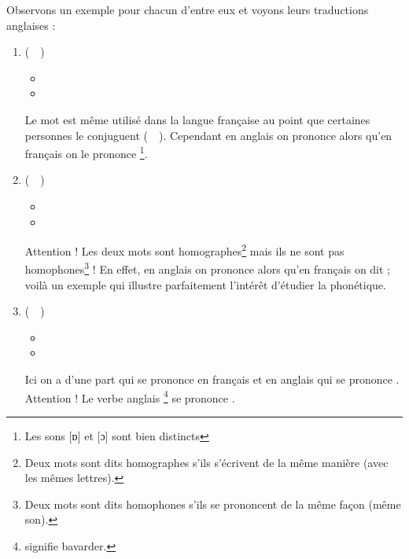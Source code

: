 Observons un exemple pour chacun d'entre eux et voyons leurs
traductions anglaises :\par

\begin{enumerate}
\item {} (~~)
  \begin{itemize}
  \item {}
    \item {}
    \end{itemize}
    Le mot  est même utilisé dans la langue française
    au point que certaines personnes le conjuguent (~~).
    Cependant en anglais on
    prononce
    \href{https://en.oxforddictionaries.com/definition/stop}{}
    alors qu'en français on le prononce
    \href{http://www.wordreference.com/fren/stop}{}\footnote{Les
      sons [ɒ] et [ɔ] sont bien distincts}.
\item {} (~~)
  \begin{itemize}
  \item {}
  \item {}
  \end{itemize}
    Attention ! Les deux mots sont homographes\footnote{Deux mots sont
      dits homographes s'ils s'écrivent de la même manière (avec les
      mêmes lettres).} mais ils ne sont pas homophones\footnote{Deux
      mots sont dits homophones s'ils se prononcent de la même façon
      (même son).} ! En effet, en anglais on prononce
    \href{https://en.oxforddictionaries.com/definition/bar}{}
    alors qu'en français on dit \href{http://www.wordreference.com/fren/bar}{}; voilà un exemple qui illustre parfaitement l'intérêt
    d'étudier la phonétique.
  \item {} (~~)
    \begin{itemize}
    \item {}
    \item {}
    \end{itemize}
    Ici on a d'une part  qui se prononce
    \href{http://www.wordreference.com/fren/chat}{} en français et
     en anglais qui se prononce
    \href{http://www.wordreference.com/enfr/cat}{}. Attention !
    Le verbe anglais \footnote{ signifie
      bavarder.} se prononce
    \href{https://en.oxforddictionaries.com/definition/chat}{}. 
\end{enumerate}


